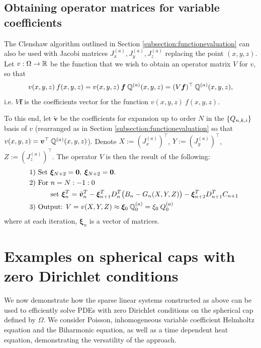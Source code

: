 \documentclass[11pt, oneside]{article}   	%
\begin{document}
\subsection{Obtaining operator matrices for variable coefficients}\label{subsection:operatorclenshaw}

The Clenshaw algorithm outlined in Section \ref{subsection:functionevaluation} can also be used with Jacobi matrices $J^{(a)}_x, J^{(a)}_y, J^{(a)}_z$ replacing the point $(x,y,z)$. Let $v : \Omega \to \mathbb{R}$ be the function that we wish to obtain an operator matrix $V$ for $v$, so that
\begin{align*}
	v(x,y,z) \: f(x,y,z) = v(x,y,z) \: \bm{f} \: \mathbb{{Q}}^{(a)}(x,y,z) = (V \bm{f})^\top \: \mathbb{{Q}}^{(a)}(x,y,z),
\end{align*}
i.e. $V \bm{f}$ is the coefficients vector for the function $v(x,y,z) \: f(x,y,z)$. 

To this end, let $\tilde{\bm{v}}$ be the coefficients for expansion up to order $N$ in the $\{Q_{n,k,i}\}$ basis of $v$ (rearranged as in Section \ref{subsection:functionevaluation} so that $v(x,y,z) = {\bm{v}}^\top \: \mathbb{{Q}}^{(a)}(x,y,z)$). Denote $X := (J_x^{(a)})^\top$, $Y := (J_y^{(a)})^\top$, $Z := (J_z^{(a)})^\top$. The operator $V$ is then the result of the following:
\begin{align*}
	\quad &\text{1) } \text{Set } \bm{\xi}_{N+2} = \bold{0}, \: \bm{\xi}_{N+2} = \bold{0}. \\
	\quad &\text{2) } \text{For } n = N:-1:0 \\
	\quad & \quad \quad \quad \text{set } \bm{\xi}_{n}^T = {\tilde{\bm{v}}_n}^T - \bm{\xi}_{n+1}^T D^T_n \big(B_n - G_n(X, Y, Z)\big) -  \bm{\xi}_{n+2}^T D^T_{n+1}C_{n+1} \\
	\quad &\text{3) } \text{Output: } V = v(X, Y, Z) \approx \bm{\xi}_{0} \: \mathbb{{Q}}^{(a)}_{0}  = \xi_{0} \: Q^{(a)}_0
\end{align*}
where at each iteration, $\bm{\xi}_n$ is a vector of matrices.



%
\section{Examples on spherical caps with zero Dirichlet conditions}\label{Section:Examples}

We now demonstrate how the sparse linear systems constructed as above can be used to efficiently solve PDEs with zero Dirichlet conditions on the spherical cap defined by $\Omega$. We consider Poisson, inhomogeneous variable coefficient Helmholtz equation and the Biharmonic equation, as well as a time dependent heat equation, demonstrating the versatility of the approach.
\end{document}
